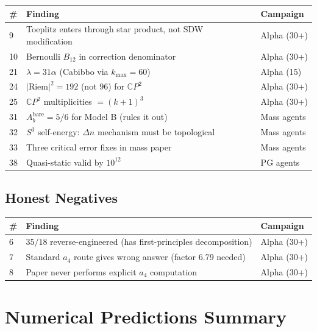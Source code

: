\documentclass[11pt,a4paper]{article}
\newcommand{\CP}{\mathbb{C}P}
\begin{document}
\begin{longtable}{@{}p{0.7cm}p{12cm}l@{}}
\toprule
\# & Finding & Campaign \\
\midrule
9 & Toeplitz enters through star product, not SDW modification & Alpha (30+) \\
10 & Bernoulli $B_{12}$ in correction denominator & Alpha (30+) \\
21 & $\lambda = 31\alpha$ (Cabibbo via $k_{\max} = 60$) & Alpha (15) \\
24 & $|\mathrm{Riem}|^2 = 192$ (not 96) for $\CP^2$ & Alpha (30+) \\
25 & $\CP^2$ multiplicities $= (k+1)^3$ & Alpha (30+) \\
31 & $A_b^{\mathrm{bare}} = 5/6$ for Model B (rules it out) & Mass agents \\
32 & $S^3$ self-energy: $\Delta n$ mechanism must be topological & Mass agents \\
33 & Three critical error fixes in mass paper & Mass agents \\
38 & Quasi-static valid by $10^{12}$ & PG agents \\
\bottomrule
\end{longtable}


\subsection{Honest Negatives}

\begin{longtable}{@{}p{0.7cm}p{12cm}l@{}}
\toprule
\# & Finding & Campaign \\
\midrule
6 & $35/18$ reverse-engineered (has first-principles decomposition) & Alpha (30+) \\
7 & Standard $a_4$ route gives wrong answer (factor 6.79 needed) & Alpha (30+) \\
8 & Paper never performs explicit $a_4$ computation & Alpha (30+) \\
\bottomrule
\end{longtable}


\section{Numerical Predictions Summary}
\end{document}
